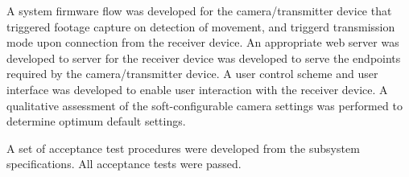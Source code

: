 \documentclass[class=report,11pt,crop=false]{standalone}
\begin{document}
A system firmware flow was developed for the camera/transmitter device that triggered footage capture on detection of movement, and triggerd transmission mode upon connection from the receiver device. An appropriate web server was developed to server for the receiver device was developed to serve the endpoints required by the camera/transmitter device. A user control scheme and user interface was developed to enable user interaction with the receiver device. A qualitative assessment of the soft-configurable camera settings was performed to determine optimum default settings.

A set of acceptance test procedures were developed from the subsystem specifications. All acceptance tests were passed.


\ifstandalone

\printnoidxglossary[type=\acronymtype,nonumberlist]
\fi
\end{document}
